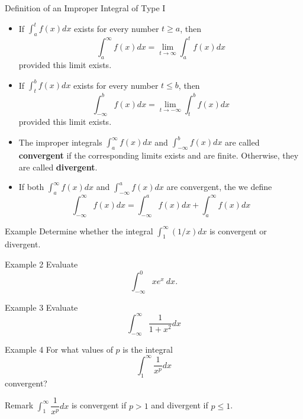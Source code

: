 \documentclass{beamer}
\begin{document}
\begin{frame}{Definition of an Improper Integral of Type I}
    \begin{itemize}
        \item If \(\int_{a}^{t}f(x)dx\) exists for every number \(t \geq a\), then \[\int_a^\infty f(x)dx = \lim_{t \to \infty} \int_a^t f(x) dx\] provided this limit exists. \pause
        \item If \(\int_{t}^{b}f(x)dx\) exists for every number \(t \leq b\), then \[\int_{-\infty}^b f(x)dx = \lim_{t \to -\infty} \int_t^b f(x) dx\] provided this limit exists. \pause
        \item The improper integrals \(\int_a^\infty f(x)dx\) and \(\int_{-\infty}^b f(x)dx\) are called \textbf{convergent} if the corresponding limits exists and are finite. Otherwise, they are called \textbf{divergent}.\pause
        \item If both \(\int_a^\infty f(x)dx\) and \(\int_{-\infty}^{a}f(x)dx\) are convergent, the we define \[
        \int_{-\infty}^{\infty} f(x)dx = \int_{-\infty}^{a}f(x)dx + \int_a^\infty f(x)dx    
        \]
    \end{itemize}
\end{frame}

\begin{frame}{Example}
    Determine whether the integral \(\int_1^\infty (1/x)dx\) is convergent or divergent. 
\end{frame}

\begin{frame}{Example 2}
    Evaluate \[\int_{-\infty}^0 x e^x~dx. \]
\end{frame}

\begin{frame}{Example 3}
    Evaluate \[\int_{-\infty}^{\infty}\dfrac{1}{1+x^2}dx\]
\end{frame}

\begin{frame}{Example 4}
    For what values of \(p\) is the integral \[\int_1^{\infty} \dfrac{1}{x^{p}}dx\] convergent? 
    
\end{frame}

\begin{frame}{Remark}
    \(\displaystyle \int_{1}^{\infty}\dfrac{1}{x^p}dx\) is convergent if \(p>1\) and divergent if \(p \leq 1\).
\end{frame}
\end{document}
